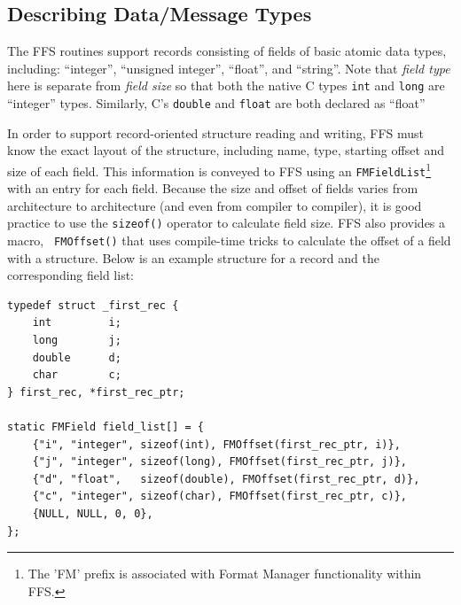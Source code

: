\subsection{Describing Data/Message Types\label{sec:datatypes}}

The FFS routines support records consisting of fields of basic atomic data
types, including: ``integer'', ``unsigned integer'', ``float'', and
``string''.  Note that {\em field type} here is separate from {\em field
  size} so that both the native C types {\tt int} and {\tt long} are 
``integer'' types.   Similarly, C's {\tt double} and {\tt float} are both
declared as ``float''

In order to support record-oriented structure reading and writing, FFS must
know the exact layout of the structure, including name, type, starting
offset and size of each field.  This information is conveyed to FFS using an
{\tt FMFieldList}\footnote{The 'FM' prefix is associated with Format Manager
  functionality within FFS.}  with an entry for each field.  Because the size
and offset of fields varies from architecture to architecture (and even from
compiler to compiler), it is good practice to use the {\tt sizeof()}
operator to calculate field size.  FFS also provides a macro, {\tt
  FMOffset()} that uses compile-time tricks to calculate the offset of a
field with a structure.  Below is an example structure for a record and the
corresponding field list:
\begin{verbatim}
typedef struct _first_rec {
    int         i;
    long        j;
    double      d;
    char        c;
} first_rec, *first_rec_ptr;

static FMField field_list[] = {
    {"i", "integer", sizeof(int), FMOffset(first_rec_ptr, i)},
    {"j", "integer", sizeof(long), FMOffset(first_rec_ptr, j)},
    {"d", "float",   sizeof(double), FMOffset(first_rec_ptr, d)},
    {"c", "integer", sizeof(char), FMOffset(first_rec_ptr, c)},
    {NULL, NULL, 0, 0},
};
\end{verbatim}

